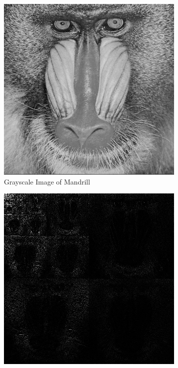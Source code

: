 \documentclass[conference]{IEEEtran}
\begin{document}
\begin{figure}[htbp]
    \centering
    \begin{subfigure}{0.7\columnwidth}
        \includegraphics[width=\textwidth]{images/mandrill_gray.png}
        \caption{Grayscale Image of Mandrill}
        \label{fig:origGray}
    \end{subfigure}
    \par\bigskip
    \begin{subfigure}{0.7\columnwidth}
        \includegraphics[width=\textwidth]{images/mandrill_linDWT.png}

\end{subfigure}
\end{figure}
\end{document}
